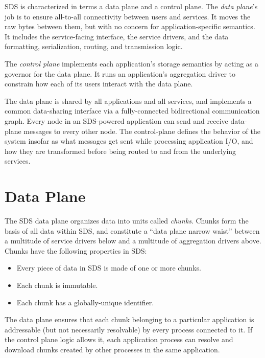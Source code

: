 SDS is characterized in terms a data plane and a control plane.
The \emph{data plane}'s job
is to ensure all-to-all connectivity between users and services.
It moves the raw bytes between them, but with no concern for
application-specific semantics.  It includes the service-facing interface, the
service drivers, and the data formatting, serialization, routing, and transmission
logic.

The \emph{control plane} implements each application's
storage semantics by acting as a governor for the data plane.
It runs an application's aggregation driver 
to constrain how each of its users interact with the data plane.

The data plane is shared by all applications and all services, and implements a
common data-sharing interface via a fully-connected bidirectional communication graph.
Every node in an SDS-powered application can send and receive data-plane
messages to every other node.  The control-plane defines the behavior of the
system insofar as what messages get sent while processing application I/O, and how they are
transformed before being routed to and from the underlying services.

\section{Data Plane}

The SDS data plane organizes data into units called \emph{chunks}.  Chunks form
the basis of all data within SDS, and constitute a ``data plane narrow waist'' between 
a multitude of service drivers below and a multitude of aggregation drivers
above.  Chunks have the following properties in SDS:

\begin{itemize}
    \item Every piece of data in SDS is made of one or more chunks.
    \item Each chunk is immutable.
    \item Each chunk has a globally-unique identifier.
\end{itemize}

The data plane ensures that each chunk belonging to a particular application
is addressable (but not necessarily resolvable) by every process connected to it.
If the control plane logic allows it, each application
process can resolve and download chunks created by other processes in the same
application.

